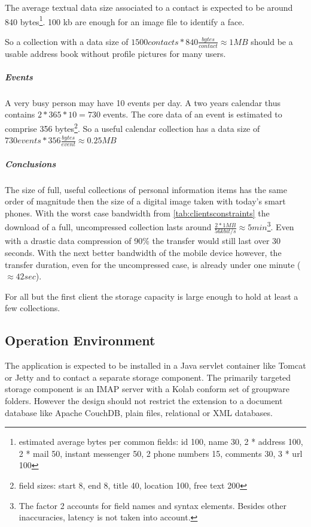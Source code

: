\documentclass[11pt,a4paper,headsepline,twoside]{scrartcl}		%
\begin{document}
The average textual data size associated to a contact is expected to be around
840 bytes\footnote{estimated average bytes per common fields: id 100, name 30, 2 *
  address 100, 2 * mail 50, instant messenger 50, 2 phone numbers 15, comments
  30, 3 * url 100}. 100 kb are enough for an image file to identify a face.

So a collection with a data size of $1500 contacts * 840 \frac{bytes}{contact}
\approx 1MB$ should be a usable address book without profile pictures for many
users.

\subparagraph{Events}

A very busy person may have 10 events per day. A two years calendar thus
contains $2*365*10=730$ events. The core data of an event is estimated to
comprise 356 bytes\footnote{field sizes: start 8, end 8, title 40, location 100,
  free text 200}. So a useful calendar collection has a data size of $730 events
* 356 \frac{bytes}{event} \approx 0.25 MB$

\subparagraph{Conclusions} The size of full, useful collections of personal
information items has the same order of magnitude then the size of a digital
image taken with today's smart phones. With the worst case bandwidth from
\autoref{tab:clientsconstraints} the download of a full, uncompressed collection
lasts around $\frac{2 * 1MB}{56kbit/s} \approx 5min$\footnote{The factor 2
  accounts for field names and syntax elements. Besides other inaccuracies,
  latency is not taken into account.}. Even with a drastic data compression of
90\% the transfer would still last over 30 seconds. With the next better
bandwidth of the mobile device however, the transfer duration, even for the
uncompressed case, is already under one minute ($\approx 42 sec$).

For all but the first client the storage capacity is large enough to hold at
least a few collections.

\subsection{Operation Environment}

The application is expected to be installed in a Java servlet container like
Tomcat or Jetty and to contact a separate storage component. The primarily
targeted storage component is an IMAP server with a Kolab conform set of
groupware folders. However the design should not restrict the extension to a
document database like Apache CouchDB, plain files, relational or XML databases.
\end{document}
